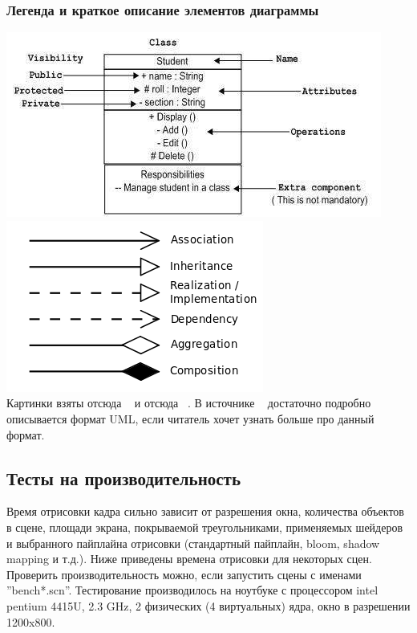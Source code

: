 \documentclass[14pt]{extarticle}
\begin{document}
\subsubsection{Легенда и краткое описание элементов диаграммы}
\includegraphics[scale=0.5]{notation_class.jpg}
\includegraphics[scale=0.5]{Uml_classes_en.svg.png}\\
Картинки взяты отсюда ~\cite{uml1} и отсюда ~\cite{uml2}. В источнике ~\cite{uml2} достаточно подробно описывается формат UML, если читатель хочет узнать больше про данный формат.

\subsection{Тесты на производительность}
Время отрисовки кадра сильно зависит от разрешения окна, количества объектов в сцене, площади экрана, покрываемой треугольниками, применяемых шейдеров и выбранного пайплайна отрисовки (стандартный пайплайн, bloom, shadow mapping и т.д.). Ниже приведены времена отрисовки для некоторых сцен. Проверить производительность можно, если запустить сцены с именами ''bench*.scn''. Тестирование производилось на ноутбуке с процессором intel pentium 4415U, 2.3 GHz, 2 физических (4 виртуальных) ядра, окно в разрешении 1200x800.
\end{document}
